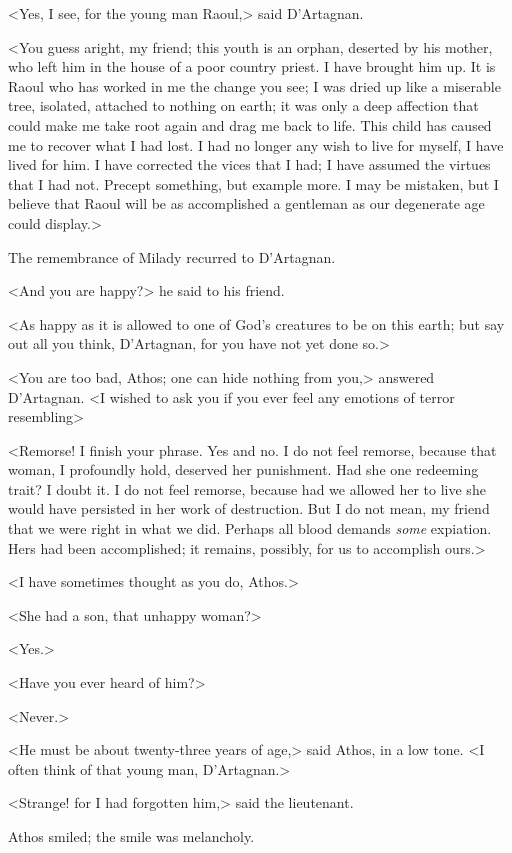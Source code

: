 <Yes, I see, for the young man Raoul,> said D'Artagnan.

<You guess aright, my friend; this youth is an orphan, deserted by his mother, who left him in the house of a poor country priest. I have brought him up. It is Raoul who has worked in me the change you see; I was dried up like a miserable tree, isolated, attached to nothing on earth; it was only a deep affection that could make me take root again and drag me back to life. This child has caused me to recover what I had lost. I had no longer any wish to live for myself, I have lived for him. I have corrected the vices that I had; I have assumed the virtues that I had not. Precept something, but example more. I may be mistaken, but I believe that Raoul will be as accomplished a gentleman as our degenerate age could display.>

The remembrance of Milady recurred to D'Artagnan.

<And you are happy?> he said to his friend.

<As happy as it is allowed to one of God's creatures to be on this earth; but say out all you think, D'Artagnan, for you have not yet done so.>

<You are too bad, Athos; one can hide nothing from you,> answered D'Artagnan. <I wished to ask you if you ever feel any emotions of terror resembling\longdash>

<Remorse! I finish your phrase. Yes and no. I do not feel remorse, because that woman, I profoundly hold, deserved her punishment. Had she one redeeming trait? I doubt it. I do not feel remorse, because had we allowed her to live she would have persisted in her work of destruction. But I do not mean, my friend that we were right in what we did. Perhaps all blood demands \emph{some} expiation. Hers had been accomplished; it remains, possibly, for us to accomplish ours.>

<I have sometimes thought as you do, Athos.>

<She had a son, that unhappy woman?>

<Yes.>

<Have you ever heard of him?>

<Never.>

<He must be about twenty-three years of age,> said Athos, in a low tone. <I often think of that young man, D'Artagnan.>

<Strange! for I had forgotten him,> said the lieutenant.

Athos smiled; the smile was melancholy.

